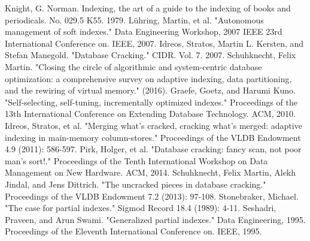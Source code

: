 \documentclass[10pt, conference, compsocconf]{IEEEtran}
\begin{document}
\begin{thebibliography}{8}

Knight, G. Norman. Indexing, the art of a guide to the indexing of books and periodicals. No. 029.5 K55. 1979.
L\"uhring, Martin, et al. "Autonomous management of soft indexes." Data Engineering Workshop, 2007 IEEE 23rd International Conference on. IEEE, 2007.
Idreos, Stratos, Martin L. Kersten, and Stefan Manegold. "Database Cracking." CIDR. Vol. 7. 2007.
Schuhknecht, Felix Martin. "Closing the circle of algorithmic and system-centric database optimization: a comprehensive survey on adaptive indexing, data partitioning, and the rewiring of virtual memory." (2016).
Graefe, Goetz, and Harumi Kuno. "Self-selecting, self-tuning, incrementally optimized indexes." Proceedings of the 13th International Conference on Extending Database Technology. ACM, 2010.
Idreos, Stratos, et al. "Merging what's cracked, cracking what's merged: adaptive indexing in main-memory column-stores." Proceedings of the VLDB Endowment 4.9 (2011): 586-597.
Pirk, Holger, et al. "Database cracking: fancy scan, not poor man's sort!." Proceedings of the Tenth International Workshop on Data Management on New Hardware. ACM, 2014.
Schuhknecht, Felix Martin, Alekh Jindal, and Jens Dittrich. "The uncracked pieces in database cracking." Proceedings of the VLDB Endowment 7.2 (2013): 97-108.
Stonebraker, Michael. "The case for partial indexes." Sigmod Record 18.4 (1989): 4-11.
Seshadri, Praveen, and Arun Swami. "Generalized partial indexes." Data Engineering, 1995. Proceedings of the Eleventh International Conference on. IEEE, 1995.

\end{thebibliography}
\end{document}
